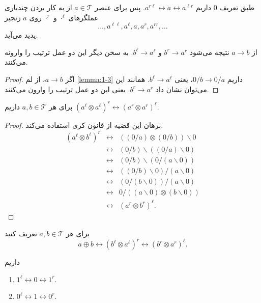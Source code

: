طبق تعریف 
$0$
داریم
$a^{r \ell} \leftrightarrow a \leftrightarrow a^{\ell r}$.
پس برای عنصر
$a \in \mathcal{T}$
از به کار بردن چندباری عملگرهای 
$\cdot^\ell$
و
$\cdot^r$
روی 
$a$
زنجیر
\[ \dots, a^{\ell \ell}, a^\ell, a, a^r, a^{rr}, \dots \]
پدید می‌آید.

\begin{proposition}
\label{proposition:order-reversing}
از 
$a \rightarrow b$
نتیجه می‌شود 
$b^r \rightarrow a^r$
و
$b^\ell \rightarrow a^\ell$.
به سخن دیگر این دو عمل ترتیب را وارونه می‌کنند.
\end{proposition}

\begin{proof}
اگر
$a \rightarrow b$،
از لم
\ref{lemma:1-3}
داریم
$0/b \rightarrow 0/a$،
یعنی
$b^\ell \rightarrow a^\ell$.
همانند این می‌توان نشان داد
$b^r \rightarrow a^r$.
یعنی این دو عمل ترتیب را وارون می‌کنند.
\end{proof}

\begin{theorem}
برای هر
$a, b \in \mathcal{T}$
داریم
$(a^\ell \otimes a^\ell)^r \leftrightarrow (a^r \otimes a^r)^\ell$.
\end{theorem}
\begin{proof}
برهان این قضیه از قانون کری استفاده می‌کند.
\begin{eqnarray}
(a^\ell \otimes b^\ell)^r &\leftrightarrow& ((0 / a) \otimes (0 / b)) \backslash 0 \nonumber \\
&\leftrightarrow& (0 / b) \backslash ((0 / a) \backslash 0) \nonumber \\
&\leftrightarrow& (0 / b) \backslash (0 / (a \backslash 0)) \nonumber \\
&\leftrightarrow& ((0 / b) \backslash 0) / (a \backslash 0) \nonumber \\
&\leftrightarrow& (0 / (b \backslash 0)) / (a \backslash 0) \nonumber \\
&\leftrightarrow& 0 / ((a \backslash 0) \otimes (b \backslash 0)) \nonumber \\
&\leftrightarrow& (a^r \otimes b^r)^\ell. \nonumber
\end{eqnarray}
\end{proof}

\begin{definition}
برای هر 
$a, b \in \mathcal{T}$
تعریف کنید
\[ a \oplus b \leftrightarrow (b^\ell \otimes a^\ell)^r \leftrightarrow (b^r \otimes a^r)^\ell. \]
\end{definition}

\begin{lemma}
داریم
\begin{enumerate}
\item
$1^\ell \leftrightarrow 0 \leftrightarrow 1^r$.
\item
$0^\ell \leftrightarrow 1 \leftrightarrow 0^r$.
\end{enumerate}
\end{lemma}

